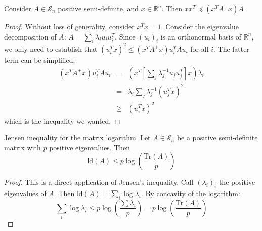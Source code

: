 \begin{lemma}\label{lem:simple-inequality}Consider $A\in\mathcal{S}_{n}$
positive semi-definite, and $x\in\mathbb{R}^{n}$. Then $xx^{T}\preceq\left(x^{T}A^{+}x\right)A$

\end{lemma}

\begin{proof}Without loss of generality, consider $x^{T}x=1$. Consider
the eigenvalue decomposition of $A$: $A=\sum_{i}\lambda_{i}u_{i}u_{i}^{T}$.
Since $\left(u_{i}\right)_{i}$ is an orthonormal basis of $\mathbb{R}^{n}$,
we only need to establish that $\left(u_{i}^{T}x\right)^{2}\leq\left(x^{T}A^{+}x\right)u_{i}^{T}Au_{i}$
for all $i$. The latter term can be simplified:
\begin{eqnarray*}
\left(x^{T}A^{+}x\right)u_{i}^{T}Au_{i} & = & \left(x^{T}\left[\sum_{j}\lambda_{j}^{-1}u_{j}u_{j}^{T}\right]x\right)\lambda_{i}\\
 & = & \lambda_{i}\sum_{j}\lambda_{j}^{-1}\left(u_{j}^{T}x\right)^{2}\\
 & \geq & \left(u_{i}^{T}x\right)^{2}
\end{eqnarray*}
which is the inequality we wanted.

\end{proof}

\begin{lemma} \label{lem:Jensen-inequality-matrix-logarithm-1}Jensen
inequality for the matrix logarithm. Let $A\in\mathcal{S}_{n}$ be
a positive semi-definite matrix with $p$ positive eigenvalues. Then
\[
\text{ld}\left(A\right)\leq p\log\left(\frac{\text{Tr}\left(A\right)}{p}\right)
\]
\end{lemma}

\begin{proof}This is a direct application of Jensen's inequality.
Call $\left(\lambda_{i}\right)_{i}$ the positive eigenvalues of $A$.
Then $\text{ld}\left(A\right)=\sum_{i}\log\lambda_{i}$. By concavity
of the logarithm:
\[
\sum_{i}\log\lambda_{i}\leq p\log\left(\frac{\sum\lambda_{i}}{p}\right)=p\log\left(\frac{\text{Tr}\left(A\right)}{p}\right)
\]


\end{proof}
